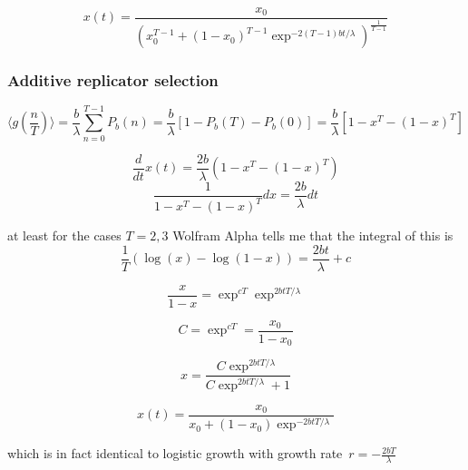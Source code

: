 

$$x(t)=\frac{x_0}{(x_0^{T-1}+(1-x_0)^{T-1}\exp^{-2(T-1)bt/\lambda})^\frac{1}{T-1}}$$

\subsubsection{Additive replicator selection}
$$\langle g(\frac{n}{T})\rangle=\frac{b}{\lambda}\sum_{n=0}^{T-1} P_b(n)=\frac{b}{\lambda}[1-P_b(T)-P_b(0)]=\frac{b}{\lambda}[1-x^T-(1-x)^T]$$

$$\frac{d}{dt}x(t)=\frac{2b}{\lambda}(1-x^T-(1-x)^T)$$
$$\frac{1}{1-x^T-(1-x)^T}dx=\frac{2b}{\lambda}dt$$

at least for the cases $T=2,3$ Wolfram Alpha tells me that the integral of this is
$$\frac{1}{T}(\log(x)-\log(1-x))=\frac{2bt}{\lambda}+c$$

$$\frac{x}{1-x}=\exp^{cT}\exp^{2btT/\lambda}$$

$$C=\exp^{cT}=\frac{x_0}{1-x_0}$$

$$x=\frac{C\exp^{2btT/\lambda}}{C\exp^{2btT/\lambda}+1}$$

$$x(t)=\frac{x_0}{x_0+(1-x_0)\exp^{-2btT/\lambda}}$$

which is in fact identical to logistic growth with growth rate~$r=-\frac{2bT}{\lambda}$
